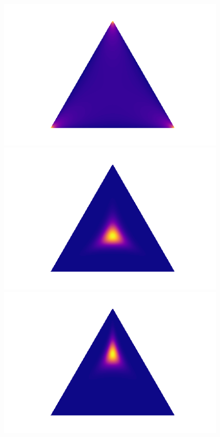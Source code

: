 \begin{figure}
\begin{minipage}[t]{.2\textwidth}
\begin{tikzpicture}[%
x={(1.7cm,0cm)},
y={(0cm,1.7cm)},
]
\end{tikzpicture}
\subcaption{}
\end{minipage}
\hfill
 \begin{minipage}[t]{.2\textwidth}
   \includegraphics[width=\textwidth]{plots/notebooks/gs1.png}
\subcaption{}
\end{minipage}
\hfill
 \begin{minipage}[t]{.2\textwidth}
   \includegraphics[width=\textwidth]{plots/notebooks/gs5.png}
\subcaption{}
\end{minipage}
\hfill
 \begin{minipage}[t]{.2\textwidth}
   \includegraphics[width=\textwidth]{plots/notebooks/gs5_shift.png}

\end{minipage}
\end{figure}
